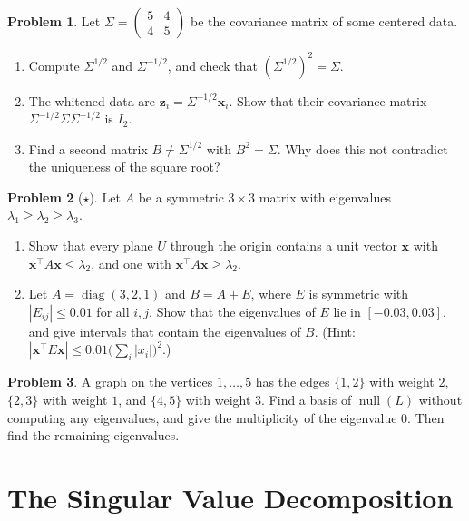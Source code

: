 \documentclass[11pt]{article}
\theoremstyle{definition}
\newtheorem{problem}{Problem}[section]
\DeclareMathOperator{\Null}{null}
\DeclareMathOperator{\diag}{diag}
\begin{document}
\begin{problem}\label{pr:sqrt-whitening}
    Let $\Sigma = \begin{pmatrix} 5 & 4 \\ 4 & 5 \end{pmatrix}$ be the covariance matrix of some centered data.
    \begin{enumerate}[label=(\alph*)]
        \item Compute $\Sigma^{1/2}$ and $\Sigma^{-1/2}$, and check that $(\Sigma^{1/2})^2 = \Sigma$.
        \item The whitened data are $\mathbf{z}_i = \Sigma^{-1/2}\mathbf{x}_i$. Show that their covariance matrix $\Sigma^{-1/2}\Sigma\Sigma^{-1/2}$ is $I_2$.
        \item Find a second matrix $B \neq \Sigma^{1/2}$ with $B^2 = \Sigma$. Why does this not contradict the uniqueness of the square root?
    \end{enumerate}
\end{problem}

\begin{problem}[$\star$]\label{pr:courant-fischer}
    Let $A$ be a symmetric $3 \times 3$ matrix with eigenvalues $\lambda_1 \geq \lambda_2 \geq \lambda_3$.
    \begin{enumerate}[label=(\alph*)]
        \item Show that every plane $U$ through the origin contains a unit vector $\mathbf{x}$ with $\mathbf{x}^\top A\mathbf{x} \leq \lambda_2$, and one with $\mathbf{x}^\top A\mathbf{x} \geq \lambda_2$.
        \item Let $A = \diag(3, 2, 1)$ and $B = A + E$, where $E$ is symmetric with $|E_{ij}| \leq 0.01$ for all $i, j$. Show that the eigenvalues of $E$ lie in $[-0.03, 0.03]$, and give intervals that contain the eigenvalues of $B$. (Hint: $|\mathbf{x}^\top E\mathbf{x}| \leq 0.01\big(\sum_i |x_i|\big)^2$.)
    \end{enumerate}
\end{problem}

\begin{problem}\label{pr:laplacian-components}
    A graph on the vertices $1, \ldots, 5$ has the edges $\{1, 2\}$ with weight $2$, $\{2, 3\}$ with weight $1$, and $\{4, 5\}$ with weight $3$. Find a basis of $\Null(L)$ without computing any eigenvalues, and give the multiplicity of the eigenvalue $0$. Then find the remaining eigenvalues.
\end{problem}

\section{The Singular Value Decomposition}
\end{document}
